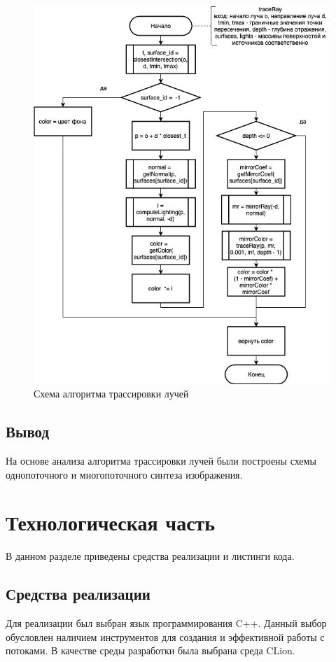 \documentclass[12pt]{report}
\begin{document}
\begin{figure}[h!p]
	\centering
	\includegraphics[scale = 0.7]{base.drawio.png}
	\caption{Схема алгоритма трассировки лучей}
	\label{fig:base}
\end{figure}

\section{Вывод}
На основе анализа алгоритма трассировки лучей были построены схемы однопоточного и многопоточного синтеза изображения. 

\chapter{Технологическая часть}

В данном разделе приведены средства реализации и листинги кода.

\section{Средства реализации}
Для реализации был выбран язык программирования C++. Данный выбор обусловлен наличием инструментов для создания и эффективной работы с потоками. В качестве среды разработки была выбрана среда CLion.
\end{document}
